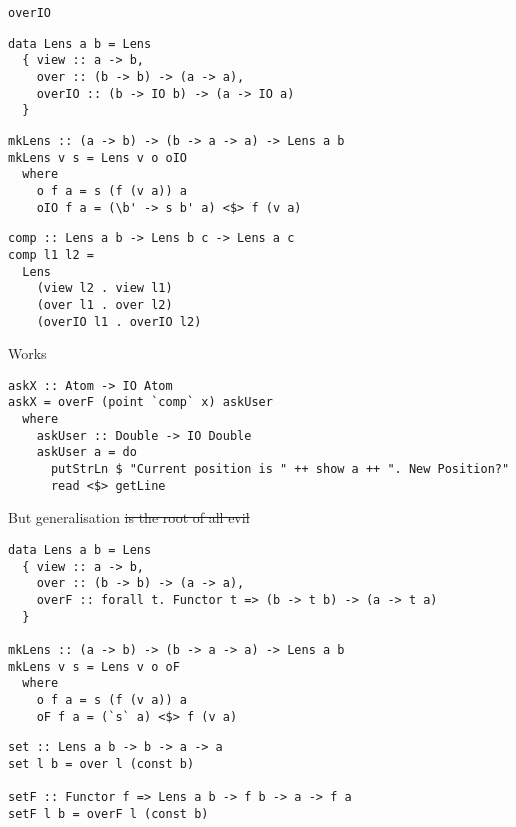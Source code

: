 \documentclass[presentation,aspectratio=169,8pt]{beamer}
\begin{document}
\begin{frame}[label={sec:org812ce49},fragile]{\texttt{overIO}}
 \begin{verbatim}
data Lens a b = Lens
  { view :: a -> b,
    over :: (b -> b) -> (a -> a),
    overIO :: (b -> IO b) -> (a -> IO a)
  }
\end{verbatim}

\pause

\begin{verbatim}
mkLens :: (a -> b) -> (b -> a -> a) -> Lens a b
mkLens v s = Lens v o oIO
  where
    o f a = s (f (v a)) a
    oIO f a = (\b' -> s b' a) <$> f (v a)
\end{verbatim}

\pause

\begin{verbatim}
comp :: Lens a b -> Lens b c -> Lens a c
comp l1 l2 =
  Lens
    (view l2 . view l1)
    (over l1 . over l2)
    (overIO l1 . overIO l2)
\end{verbatim}
\end{frame}

\begin{frame}[label={sec:org85f7069},fragile]{Works}
 \begin{verbatim}
askX :: Atom -> IO Atom
askX = overF (point `comp` x) askUser
  where
    askUser :: Double -> IO Double
    askUser a = do
      putStrLn $ "Current position is " ++ show a ++ ". New Position?"
      read <$> getLine
\end{verbatim}
\end{frame}

\begin{frame}[label={sec:orgcd475dc},fragile]{But generalisation \sout{is the root of all evil}}
 \begin{verbatim}
data Lens a b = Lens
  { view :: a -> b,
    over :: (b -> b) -> (a -> a),
    overF :: forall t. Functor t => (b -> t b) -> (a -> t a)
  }

mkLens :: (a -> b) -> (b -> a -> a) -> Lens a b
mkLens v s = Lens v o oF
  where
    o f a = s (f (v a)) a
    oF f a = (`s` a) <$> f (v a)
\end{verbatim}

\pause

\begin{verbatim}
set :: Lens a b -> b -> a -> a
set l b = over l (const b)

setF :: Functor f => Lens a b -> f b -> a -> f a
setF l b = overF l (const b)
\end{verbatim}
\end{frame}
\end{document}
